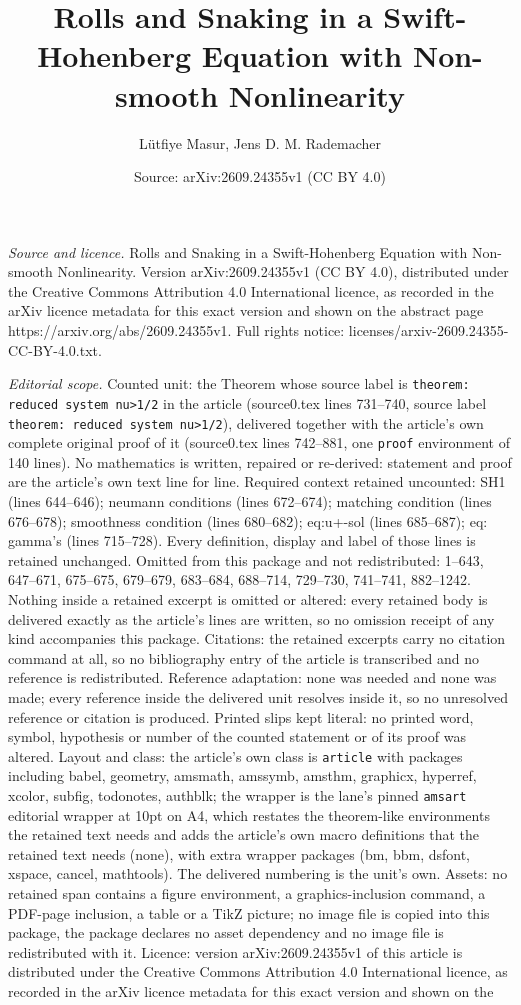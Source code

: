 \documentclass[10pt,a4paper]{amsart}
\title[Rolls and Snaking in a Swift-Hohenberg Equation with Non-smo]{Rolls and Snaking in a Swift-Hohenberg Equation with Non-smooth Nonlinearity}
\author{L\"utfiye Masur, Jens D. M. Rademacher}
\date{Source: arXiv:2609.24355v1 (CC BY 4.0)}
\begin{document}
\maketitle

\noindent\emph{Source and licence.} Rolls and Snaking in a Swift-Hohenberg Equation with Non-smooth Nonlinearity. Version arXiv:2609.24355v1 (CC BY 4.0), distributed under the Creative Commons Attribution 4.0 International licence, as recorded in the arXiv licence metadata for this exact version and shown on the abstract page https://arxiv.org/abs/2609.24355v1. Full rights notice: licenses/arxiv-2609.24355-CC-BY-4.0.txt.\par\smallskip

\noindent\textit{Editorial scope.} Counted unit: the Theorem whose source label is \texttt{theorem: reduced system nu>1/2} in the article (source0.tex lines 731--740, source label \texttt{theorem: reduced system nu>1/2}), delivered together with the article's own complete original proof of it (source0.tex lines 742--881, one \texttt{proof} environment of 140 lines). No mathematics is written, repaired or re-derived: statement and proof are the article's own text line for line. Required context retained uncounted: SH1 (lines 644--646); neumann conditions (lines 672--674); matching condition (lines 676--678); smoothness condition (lines 680--682); eq:u+-sol (lines 685--687); eq: gamma's (lines 715--728). Every definition, display and label of those lines is retained unchanged. Omitted from this package and not redistributed: 1--643, 647--671, 675--675, 679--679, 683--684, 688--714, 729--730, 741--741, 882--1242. Nothing inside a retained excerpt is omitted or altered: every retained body is delivered exactly as the article's lines are written, so no omission receipt of any kind accompanies this package. Citations: the retained excerpts carry no citation command at all, so no bibliography entry of the article is transcribed and no reference is redistributed. Reference adaptation: none was needed and none was made; every reference inside the delivered unit resolves inside it, so no unresolved reference or citation is produced. Printed slips kept literal: no printed word, symbol, hypothesis or number of the counted statement or of its proof was altered. Layout and class: the article's own class is \texttt{article} with packages including babel, geometry, amsmath, amssymb, amsthm, graphicx, hyperref, xcolor, subfig, todonotes, authblk; the wrapper is the lane's pinned \texttt{amsart} editorial wrapper at 10pt on A4, which restates the theorem-like environments the retained text needs and adds the article's own macro definitions that the retained text needs (none), with extra wrapper packages (bm, bbm, dsfont, xspace, cancel, mathtools). The delivered numbering is the unit's own. Assets: no retained span contains a figure environment, a graphics-inclusion command, a PDF-page inclusion, a table or a TikZ picture; no image file is copied into this package, the package declares no asset dependency and no image file is redistributed with it. Licence: version arXiv:2609.24355v1 of this article is distributed under the Creative Commons Attribution 4.0 International licence, as recorded in the arXiv licence metadata for this exact version and shown on the 
\end{document}
